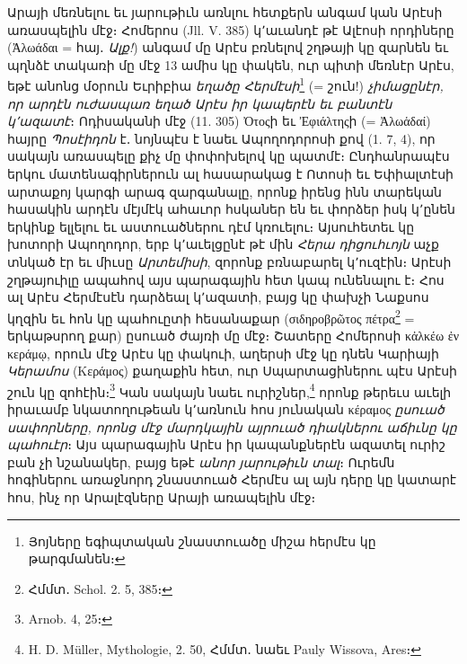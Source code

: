 \documentclass{article}
\begin{document}
{Արայի մեռնելու եւ յարութիւն առնլու հետքերն անգամ կան Արէսի առասպելին մէջ։ Հոմերոս (Jll. V. 385) կ՚աւանդէ թէ Ալէոսի որդիները (Ἀλωάδαι = հայ․ \emph{Ալք!}) անգամ մը Արէս բռնելով շղթայի կը զարնեն եւ պղնձէ տակառի մը մէջ 13 ամիս կը փակեն, ուր պիտի մեռնէր Արէս, եթէ անոնց մօրուն Եւրիբիա \emph{եղածը Հերմէսի}\footnote{Յոյները եգիպտական շնաստուածը միշա հերմէս կը թարգմանեն։} (= շուն!) \emph{չիմացընէր, որ արդէն ուժասպառ եղած Արէս իր կապերէն եւ բանտէն կ՚ազատէ}։ Ոդիսականի մէջ (11. 305) Ὀτοςի եւ Ἐφιάλτηςի (= Ἀλωἁδαί) հայրը \emph{Պոսէիդոն} է․ նոյնպէս է նաեւ Ապողոդորոսի քով (1. 7, 4), որ սակայն առասպելը քիչ մը փոփոխելով կը պատմէ։ Ընդհանրապէս երկու մատենագիրներուն ալ հասարակաց է Ոտոսի եւ Եփիալտէսի արտաքոյ կարգի արագ զարգանալը, որոնք իրենց ինն տարեկան հասակին արդէն մէյմէկ ահաւոր հսկաներ են եւ փորձեր իսկ կ՚ընեն երկինք ելլելու եւ աստուածներու դէմ կռուելու։ Այսուհետեւ կը խոտորի Ապողոդոր, երբ կ՚աւելցընէ թէ մին \emph{Հերա դիցուհւոյն} աչք տնկած էր եւ միւսը \emph{Արտեմիսի}, զորոնք բռնաբարել կ՚ուզէին։ Արէսի շղթայուիլը ապահով այս պարագային հետ կապ ունենալու է։ Հոս ալ Արէս Հերմէսէն դարձեալ կ՚ազատի, բայց կը փախչի Նաքսոս կղզին եւ հոն կը պահուըտի հեսանաքար (σιδηροβρῶτος πέτρα\footnote{Հմմտ․ Schol. 2. 5, 385։} = երկաթսրող քար) ըսուած ժայռի մը մէջ։ Շատերը Հոմերոսի κἀλκέω ἐν κεράμῳ, որուն մէջ Արէս կը փակուի, աղերսի մէջ կը դնեն Կարիայի \emph{Կերամոս} (Κεράμος) քաղաքին հետ, ուր Սպարտացիներու պէս Արէսի շուն կը զոհէին։\footnote{Arnob. 4, 25։} Կան սակայն նաեւ ուրիշներ,\footnote{H. D. Müller, Mythologie, 2. 50, Հմմտ․ նաեւ Pauly Wissova, Ares։} որոնք թերեւս աւելի իրաւամբ նկատողութեան կ՚առնուն հոս յունական κέραμος \emph{ըսուած սափորները, որոնց մէջ մարդկային այրուած դիակներու աճիւնը կը պահուէր}։ Այս պարագային Արէս իր կապանքներէն ազատել ուրիշ բան չի նշանակեր, բայց եթէ \emph{անոր յարութիւն տալ}։ Ուրեմն հոգիներու առաջնորդ շնաստուած Հերմէս ալ այն դերը կը կատարէ հոս, ինչ որ Արալէզները Արայի առապելին մէջ։

}
\end{document}
